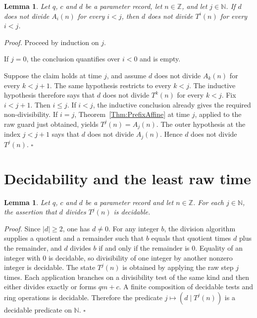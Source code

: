 \documentclass[11pt,letterpaper]{article}
\newcommand{\N}{\mathbb{N}}
\newcommand{\Z}{\mathbb{Z}}
\newtheorem{lemma}[theorem]{Lemma}
\newenvironment{proof}{\noindent\textit{Proof.}}{\hfill\(\square\)}
\begin{document}
\begin{lemma}\label{Lem:RawFree}
Let \(q\), \(c\) and \(d\) be a parameter record, let \(n\in\Z\), and let \(j\in\N\). If \(d\) does not divide \(A_{i}(n)\) for every \(i<j\), then \(d\) does not divide \(T^{i}(n)\) for every \(i<j\).
\end{lemma}

\begin{proof}
Proceed by induction on \(j\).

If \(j=0\), the conclusion quantifies over \(i<0\) and is empty.

Suppose the claim holds at time \(j\), and assume \(d\) does not divide \(A_{k}(n)\) for every \(k<j+1\). The same hypothesis restricts to every \(k<j\). The inductive hypothesis therefore says that \(d\) does not divide \(T^{k}(n)\) for every \(k<j\). Fix \(i<j+1\). Then \(i\le j\). If \(i<j\), the inductive conclusion already gives the required non-divisibility. If \(i=j\), Theorem~\ref{Thm:PrefixAffine} at time \(j\), applied to the raw guard just obtained, yields \(T^{j}(n)=A_{j}(n)\). The outer hypothesis at the index \(j<j+1\) says that \(d\) does not divide \(A_{j}(n)\). Hence \(d\) does not divide \(T^{j}(n)\).
\end{proof}

\section{Decidability and the least raw time}

\begin{lemma}\label{Lem:Decidable}
Let \(q\), \(c\) and \(d\) be a parameter record and let \(n\in\Z\). For each \(j\in\N\), the assertion that \(d\) divides \(T^{j}(n)\) is decidable.
\end{lemma}

\begin{proof}
Since \(|d|\ge 2\), one has \(d\neq 0\). For any integer \(b\), the division algorithm supplies a quotient and a remainder such that \(b\) equals that quotient times \(d\) plus the remainder, and \(d\) divides \(b\) if and only if the remainder is \(0\). Equality of an integer with \(0\) is decidable, so divisibility of one integer by another nonzero integer is decidable. The state \(T^{j}(n)\) is obtained by applying the raw step \(j\) times. Each application branches on a divisibility test of the same kind and then either divides exactly or forms \(qm+c\). A finite composition of decidable tests and ring operations is decidable. Therefore the predicate \(j\mapsto(d\mid T^{j}(n))\) is a decidable predicate on \(\N\).
\end{proof}
\end{document}
